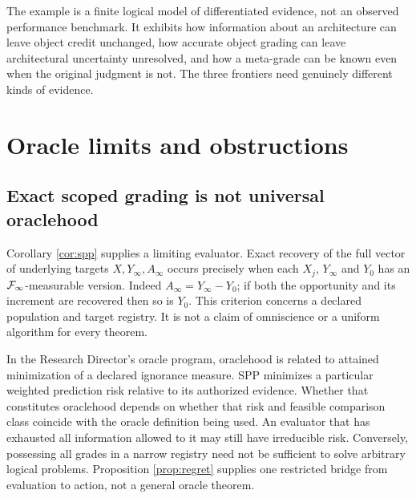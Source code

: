 \documentclass[11pt]{article}
\begin{document}
The example is a finite logical model of differentiated evidence, not an observed performance benchmark. It exhibits how information about an architecture can leave object credit unchanged, how accurate object grading can leave architectural uncertainty unresolved, and how a meta-grade can be known even when the original judgment is not. The three frontiers need genuinely different kinds of evidence.
\section{Oracle limits and obstructions}
\subsection{Exact scoped grading is not universal oraclehood}
Corollary \ref{cor:spp} supplies a limiting evaluator. Exact recovery of the full vector of underlying targets $X,Y_\infty,A_\infty$ occurs precisely when each $X_j$, $Y_\infty$ and $Y_0$ has an $\mathcal F_\infty$-measurable version. Indeed $A_\infty=Y_\infty-Y_0$; if both the opportunity and its increment are recovered then so is $Y_0$. This criterion concerns a declared population and target registry. It is not a claim of omniscience or a uniform algorithm for every theorem.

In the Research Director's oracle program, oraclehood is related to attained minimization of a declared ignorance measure. SPP minimizes a particular weighted prediction risk relative to its authorized evidence. Whether that constitutes oraclehood depends on whether that risk and feasible comparison class coincide with the oracle definition being used. An evaluator that has exhausted all information allowed to it may still have irreducible risk. Conversely, possessing all grades in a narrow registry need not be sufficient to solve arbitrary logical problems. Proposition \ref{prop:regret} supplies one restricted bridge from evaluation to action, not a general oracle theorem.
\end{document}
